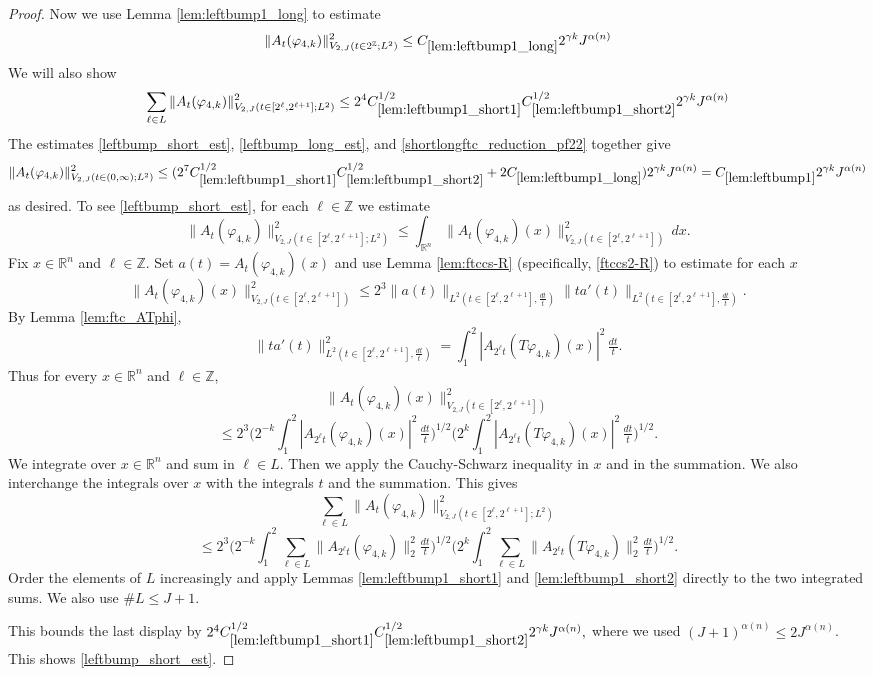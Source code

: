 \documentclass[12pt,reqno]{amsart}
\theoremstyle{plain}
\numberwithin{equation}{section}
\theoremstyle{remark}
\begin{document}
\begin{proof}
 Now we use Lemma \ref{lem:leftbump1_long} to estimate
 \begin{equation}
     \label{leftbump_long_est}
     \|A_{t}(\varphi_{4,k})\|^2_{V_{2,J}(t\in 2^\mathbb{Z}; L^2)} \le C_{\ref{lem:leftbump1_long}} 2^{\gamma k}J^{\alpha(n)}
 \end{equation}
We will also show
\begin{equation}
    \label{leftbump_short_est}
    \sum_{\ell \in L} \|A_t(\varphi_{4,k})\|_{V_{2,J}(t\in [2^\ell, 2^{\ell+1}]; L^2)}^2 \le2^4C_{\ref{lem:leftbump1_short1}}^{1/2}C_{\ref{lem:leftbump1_short2}}^{1/2}2^{\gamma k}J^{\alpha(n)}
\end{equation}
The estimates \eqref{leftbump_short_est}, \eqref{leftbump_long_est}, and \eqref{shortlongftc_reduction_pf22} together give
\[\|A_{t}(\varphi_{4,k})\|_{V_{2,J}(t\in(0,\infty);L^2)}^2  \le (2^7C_{\ref{lem:leftbump1_short1}}^{1/2} C_{\ref{lem:leftbump1_short2}}^{1/2}  + 2C_{\ref{lem:leftbump1_long}}) 2^{\gamma k} J^{\alpha(n)} = C_{\ref{lem:leftbump1}} 2^{\gamma k} J^{\alpha(n)}  \]
as desired.
To see \eqref{leftbump_short_est},
for each $\ell\in\mathbb{Z}$ we estimate
\[ \|A_t(\varphi_{4,k})\|_{V_{2,J}(t\in [2^\ell, 2^{\ell+1}]; L^2)}^2 \le \int_{\mathbb{R}^n}  \|A_t(\varphi_{4,k})(x)\|_{V_{2,J}(t\in [2^\ell, 2^{\ell+1}])}^2\, dx.\]
Fix $x\in\mathbb{R}^n$ and $\ell\in\mathbb{Z}$. Set $a(t)=A_t(\varphi_{4,k})(x)$ and use Lemma \ref{lem:ftccs-R} (specifically, \eqref{ftccs2-R}) to estimate for each $x$
\[ \|A_t(\varphi_{4,k})(x)\|_{V_{2,J}(t\in [2^\ell, 2^{\ell+1}])}^2 \le  2^3
\|a(t)\|_{L^2(t\in [2^\ell, 2^{\ell+1}],\tfrac{dt}{t})} \|ta'(t)\|_{L^2(t\in [2^\ell, 2^{\ell+1}],\tfrac{dt}{t})}.  \]
By Lemma \ref{lem:ftc_ATphi},
\[ \|ta'(t)\|_{L^2(t\in [2^\ell, 2^{\ell+1}],\tfrac{dt}{t})}^2 = \int_{1}^2 |A_{2^\ell t}(T\varphi_{4,k})(x)|^2\,\tfrac{dt}{t}. \]
Thus for every $x\in\mathbb{R}^n$ and $\ell\in\mathbb{Z}$,
\[ \|A_t(\varphi_{4,k})(x)\|_{V_{2,J}(t\in [2^\ell, 2^{\ell+1}])}^2\]
\[ \le 2^3 \Big( 2^{-k} \int_{1}^2 |A_{2^\ell t}(\varphi_{4,k})(x)|^2\,\tfrac{dt}{t} \Big)^{1/2} \Big( 2^{k}  \int_{1}^2 |A_{2^\ell t}(T{\varphi_{4,k}})(x)|^2\,\tfrac{dt}{t} \Big)^{1/2}.  \]
We integrate over $x\in\mathbb{R}^n$ and sum in $\ell\in L$.  Then we apply the Cauchy-Schwarz inequality in $x$ and in the summation.   We also interchange the integrals over $x$ with the integrals $t$ and the summation. This gives
\[ \sum_{\ell \in L}\|A_t(\varphi_{4,k})\|_{V_{2,J}(t\in [2^\ell, 2^{\ell+1}]; L^2)}^2 \]
\[\le2^3\Big( 2^{-k} \int_1^2 \sum_{\ell\in L}\|A_{2^\ell t}(\varphi_{4,k})\|_2^2 \tfrac{dt}{t} \Big)^{1/2}\Big( 2^k \int_1^2 \sum_{\ell \in L}\|A_{2^\ell t}(T\varphi_{4,k})\|_2^2 \tfrac{dt}{t} \Big)^{1/2}   . \]
Order the elements of $L$ increasingly and apply Lemmas \ref{lem:leftbump1_short1} and \ref{lem:leftbump1_short2} directly to the two integrated sums. We also use $\#L\le J+1$.

This bounds the last display by
$2^4C_{\ref{lem:leftbump1_short1}}^{1/2}C_{\ref{lem:leftbump1_short2}}^{1/2}2^{\gamma k}J^{\alpha(n)},$
where we used $(J+1)^{\alpha(n)}\le2J^{\alpha(n)}$. This shows \eqref{leftbump_short_est}.
\end{proof}
\end{document}
